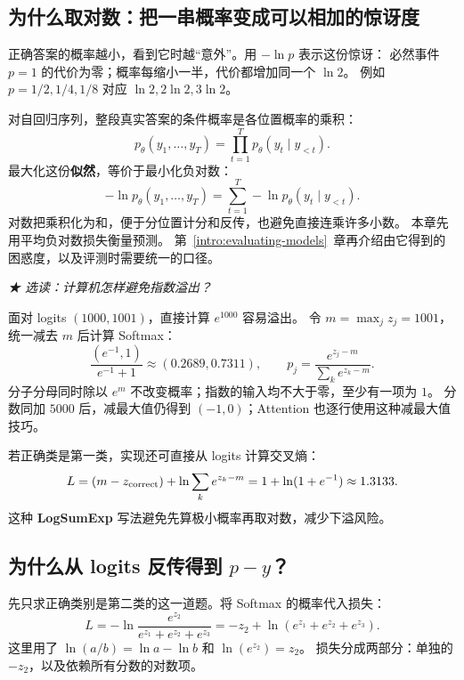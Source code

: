\subsection{为什么取对数：把一串概率变成可以相加的惊讶度}
正确答案的概率越小，看到它时越“意外”。用 $-\ln p$ 表示这份惊讶：
必然事件 $p=1$ 的代价为零；概率每缩小一半，代价都增加同一个 $\ln2$。
例如 $p=1/2,1/4,1/8$ 对应 $\ln2,2\ln2,3\ln2$。

对自回归序列，整段真实答案的条件概率是各位置概率的乘积：
\[
p_\theta(y_1,\ldots,y_T)=\prod_{t=1}^T p_\theta(y_t\mid y_{<t}).
\]
最大化这份\textbf{似然}，等价于最小化负对数：
\[
-\ln p_\theta(y_1,\ldots,y_T)
=\sum_{t=1}^T-\ln p_\theta(y_t\mid y_{<t}).
\]
对数把乘积化为和，便于分位置计分和反传，也避免直接连乘许多小数。
本章先用平均负对数损失衡量预测。
第~\ref*{intro:evaluating-models}~章再介绍由它得到的困惑度，以及评测时需要统一的口径。

\begin{example}
\noindent\emph{{\symboliconfont ★} 选读：计算机怎样避免指数溢出？}\par
面对 logits $(1000,1001)$，直接计算 $e^{1000}$ 容易溢出。
令 $m=\max_jz_j=1001$，统一减去 $m$ 后计算 Softmax：
\[
\frac{(e^{-1},1)}{e^{-1}+1}\approx(0.2689,0.7311),\qquad
p_j=\frac{e^{z_j-m}}{\sum_k e^{z_k-m}}.
\]
分子分母同时除以 $e^m$ 不改变概率；指数的输入均不大于零，至少有一项为 $1$。
分数同加 $5000$ 后，减最大值仍得到 $(-1,0)$；Attention 也逐行使用这种减最大值技巧。

若正确类是第一类，实现还可直接从 logits 计算交叉熵：
\[
L=(m-z_{\rm correct})+\ln\sum_k e^{z_k-m}
=1+\ln(1+e^{-1})\approx1.3133.
\]
这种 \textbf{LogSumExp} 写法避免先算极小概率再取对数，减少下溢风险。
\end{example}

\subsection{\texorpdfstring{为什么从 logits 反传得到 $p-y$？}{为什么从 logits 反传得到 p 减 y？}}
\label{concept:logit-gradient}

先只求正确类别是第二类的这一道题。将 Softmax 的概率代入损失：
\[
L=-\ln\frac{e^{z_2}}{e^{z_1}+e^{z_2}+e^{z_3}}
=-z_2+\ln(e^{z_1}+e^{z_2}+e^{z_3}).
\]
这里用了 $\ln(a/b)=\ln a-\ln b$ 和 $\ln(e^{z_2})=z_2$。
损失分成两部分：单独的 $-z_2$，以及依赖所有分数的对数项。

